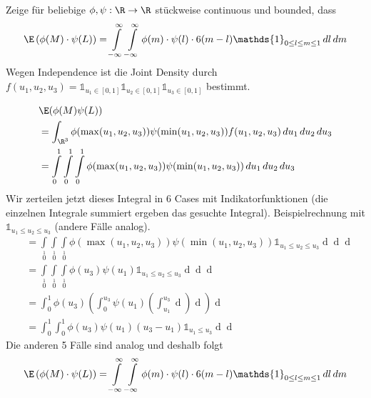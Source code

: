 Zeige für beliebige $\phi, \psi: \R \to \R$ stückweise continuous und bounded, dass 
\[\E\left(\phi(M)\cdot\psi(L)\right) = \int\limits_{-\infty}\limits^\infty \int\limits_{-\infty}\limits^\infty \phi(m) \cdot \psi(l) \cdot6(m-l)\mathds{1}_{0\leq l\leq m \leq 1}\mathop{dl}\mathop{dm}\]
Wegen Independence ist die Joint Density durch $f(u_1, u_2, u_3) = \mathds{1}_{u_1 \in [0,1]}\mathds{1}_{u_2 \in [0,1]}\mathds{1}_{u_3 \in [0,1]}$ bestimmt.

\begin{align*}
	&\E(\phi(M)\psi(L)) \\
	&= \int_{\R^3} \phi(\max(u_1, u_2, u_3))\psi(\min(u_1, u_2, u_3)) f(u_1, u_2, u_3) \mathop{du_1}\mathop{du_2}\mathop{du_3}\\
	&= \int\limits_0\limits^1 \int\limits_0\limits^1 \int\limits_0\limits^1 \phi(\max(u_1, u_2, u_3))\psi(\min(u_1, u_2, u_3)) \mathop{du_1}\mathop{du_2}\mathop{du_3}
\end{align*}
Wir zerteilen jetzt dieses Integral in 6 Cases mit Indikatorfunktionen (die einzelnen Integrale summiert ergeben das gesuchte Integral). 
Beispielrechnung mit $\mathds{1}_{u_1 \leq u_2 \leq u_3}$ (andere Fälle analog).
\begin{align*}
	&= \int\limits_0\limits^1 \int\limits_0\limits^1 \int\limits_0\limits^1 \phi(\max(u_1, u_2, u_3))\psi(\min(u_1, u_2, u_3)) \mathds{1}_{u_1 \leq u_2 \leq u_3} \mathop{du_1}\mathop{du_2}\mathop{du_3}\\
	&= \int\limits_0\limits^1 \int\limits_0\limits^1 \int\limits_0\limits^1 \phi(u_3)\psi(u_1) \mathds{1}_{u_1 \leq u_2 \leq u_3} \mathop{du_1}\mathop{du_2}\mathop{du_3}\\
	&= \int_0^1 \phi(u_3) \left(\int_0^{u_3}\psi(u_1)\left(\int_{u_1}^{u_3}\mathop{du_2}\right)\mathop{du_1}\right)\mathop{du_3}\\
	&= \int_0^1\int_0^1 \phi(u_3)\psi(u_1)(u_3-u_1)\mathds{1}_{u_1\leq u_3}\mathop{du_1}\mathop{du_3}
\end{align*}
Die anderen 5 Fälle sind analog und deshalb folgt
\[\E\left(\phi(M)\cdot\psi(L)\right) = \int\limits_{-\infty}\limits^\infty \int\limits_{-\infty}\limits^\infty \phi(m) \cdot \psi(l) \cdot6(m-l)\mathds{1}_{0\leq l\leq m \leq 1}\mathop{dl}\mathop{dm}\]